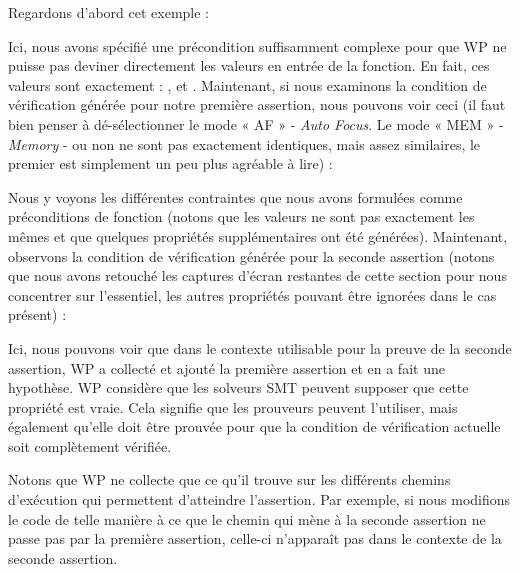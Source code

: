 


Regardons d'abord cet exemple :





Ici, nous avons spécifié une précondition suffisamment complexe pour que WP ne
puisse pas deviner directement les valeurs en entrée de la fonction. En fait, ces
valeurs sont exactement : ,  et
. Maintenant, si nous examinons la condition de vérification
générée pour notre première assertion, nous pouvons voir ceci (il faut bien
penser à dé-sélectionner le mode « AF » - \textit{Auto Focus}. Le mode « MEM »
- \textit{Memory} - ou non ne sont pas exactement identiques, mais assez
similaires, le premier est simplement un peu plus agréable à lire) :




Nous y voyons les différentes contraintes que nous avons formulées comme préconditions
de fonction (notons que les valeurs ne sont pas exactement les mêmes et que quelques
propriétés supplémentaires ont été générées). Maintenant, observons
la condition de vérification générée pour la seconde assertion (notons que nous avons
retouché les captures d'écran restantes de cette section pour nous concentrer sur
l'essentiel, les autres propriétés pouvant être ignorées dans le cas présent) :




Ici, nous pouvons voir que dans le contexte utilisable pour la preuve de la seconde
assertion, WP a collecté et ajouté la première assertion et en a fait une hypothèse.
WP considère que les solveurs SMT peuvent supposer que cette propriété est vraie.
Cela signifie que les prouveurs peuvent l'utiliser, mais également qu'elle doit être
prouvée pour que la condition de vérification actuelle soit complètement vérifiée.


Notons que WP ne collecte que ce qu'il trouve sur les différents chemins d'exécution
qui permettent d'atteindre l'assertion. Par exemple, si nous modifions le code de
telle manière à ce que le chemin qui mène à la seconde assertion ne passe pas
par la première assertion, celle-ci n'apparaît pas dans le contexte de la seconde
assertion.






